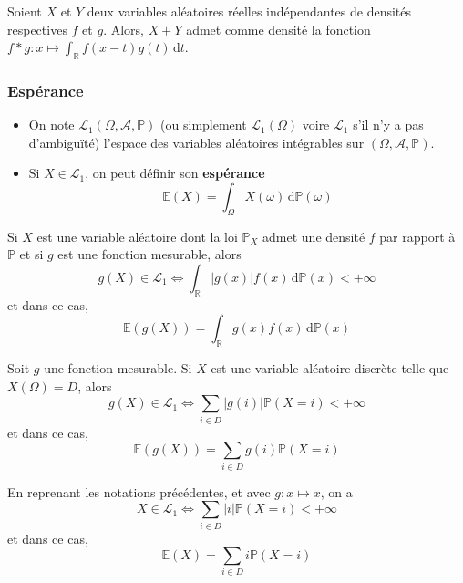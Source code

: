 
  \begin{theorem}
    Soient $X$ et $Y$ deux variables aléatoires réelles indépendantes de densités respectives $f$ et $g$. Alors, $X + Y$ admet comme densité la fonction $f * g : x \mapsto \int_{\mathbb{R}} f(x-t) g(t) \, \mathrm{d}t$.
  \end{theorem}

  \subsubsection{Espérance}


  \begin{definition}
    \begin{itemize}
      \item On note $\mathcal{L}_1(\Omega, \mathcal{A}, \mathbb{P})$ (ou simplement $\mathcal{L}_1(\Omega)$ voire $\mathcal{L}_1$ s'il n'y a pas d'ambiguïté) l'espace des variables aléatoires intégrables sur $(\Omega, \mathcal{A}, \mathbb{P})$.
      \item Si $X \in \mathcal{L}_1$, on peut définir son \textbf{espérance}
      \[ \mathbb{E}(X) = \int_\Omega X(\omega) \, \mathrm{d}\mathbb{P}(\omega) \]
    \end{itemize}
  \end{definition}


  \begin{theorem}
    Si $X$ est une variable aléatoire dont la loi $\mathbb{P}_X$ admet une densité $f$ par rapport à $\mathbb{P}$ et si $g$ est une fonction mesurable, alors
    \[ g(X) \in \mathcal{L}_1 \iff \int_{\mathbb{R}} \vert g(x) \vert f(x) \, \mathrm{d}\mathbb{P}(x) < +\infty \]
    et dans ce cas,
    \[ \mathbb{E}(g(X)) = \int_{\mathbb{R}} g(x) f(x) \, \mathrm{d}\mathbb{P}(x) \]
  \end{theorem}

  \begin{corollary}
    Soit $g$ une fonction mesurable. Si $X$ est une variable aléatoire discrète telle que $X(\Omega) = D$, alors
    \[ g(X) \in \mathcal{L}_1 \iff \sum_{i \in D} \vert g(i) \vert \mathbb{P}(X = i) < +\infty \]
    et dans ce cas,
    \[ \mathbb{E}(g(X)) = \sum_{i \in D} g(i) \mathbb{P}(X = i) \]
  \end{corollary}

  \begin{remark}
    En reprenant les notations précédentes, et avec $g : x \mapsto x$, on a
    \[ X \in \mathcal{L}_1 \iff \sum_{i \in D} \vert i \vert \mathbb{P}(X = i) < +\infty \]
    et dans ce cas,
    \[ \mathbb{E}(X) = \sum_{i \in D} i \mathbb{P}(X = i) \]
  \end{remark}

